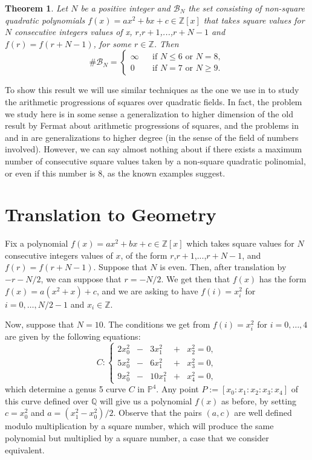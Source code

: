 \documentclass[a4paper,12pt]{amsart}
\newtheorem{thm}{Theorem}
\theoremstyle{remark}
\theoremstyle{definition}
\begin{document}
\begin{thm}\label{Mthm}
Let $N$ be a positive integer and $\mathcal{B}_N$ the set
consisting of non-square quadratic polynomials $f(x)=a x^2+b x+c
\in {{\mathbb{Z}}}[x]$ that takes square values for $N$ consecutive integers
values of x, $r$,$r+1$,...,$r+N-1$ and $f(r)=f(r+N-1)$, for some
$r\in{{\mathbb{Z}}}$. Then
$$
\#\mathcal{B}_N=\left\{
\begin{array}{ccl}
\infty & & \mbox{if $N\le 6$ or $N=8$},\\[1mm]
0 & & \mbox{if $N=7$ or $N\ge 9$}.
\end{array}
\right.
$$
\end{thm}

To show this result we will use similar techniques as the one we
use in \cite{GX} to study the arithmetic progressions of squares
over quadratic fields. In fact, the problem we study here is in
some sense a generalization to higher dimension of the old result
by Fermat about arithmetic progressions of squares, and the
problems in \cite{GX} and in \cite{X} are generalizations to
higher degree (in the sense of the field of numbers involved).
However, we can say almost nothing about if there exists a maximum
number of consecutive square values taken by a non-square
quadratic polinomial, or even if this number is $8$, as the known
examples suggest.

\section{Translation to Geometry}\label{sec2}

Fix a polynomial $f(x)=a x^2+b x+c \in {{\mathbb{Z}}}[x]$ which takes square
values for $N$ consecutive integers values of $x$, of the form
$r$,$r+1$,...,$r+N-1$, and $f(r)=f(r+N-1)$. Suppose that $N$ is even.
Then, after translation by $-r-N/2$, we can suppose that $r=-N/2$.
We get then that $f(x)$ has the form $f(x)=a(x^2+x)+c$, and we are
asking to have $f(i)=x_i^2$ for $i=0,\dots,N/2-1$ and $x_i\in {{\mathbb{Z}}}$.

Now, suppose that $N=10$. The conditions we get from $f(i)=x_i^2$
for $i=0,\dots,4$ are given by the following equations:
$$
C:\left\{
\begin{array}{rcrcc}
2 x_0^2 \!\!\! & - &\!\!\!\!\! 3 x_1^2 &\!\!\! + &\!\!\! x_2^2=0,\\[1mm]
5x_0^2 \!\!\!  & - &\!\!\!\!\! 6 x_1^2 &\!\!\! + &\!\!\! x_3^2=0,\\[1mm]
9 x_0^2 \!\!\! & - &\!\!\!\!\! 10x_1^2 &\!\!\! + &\!\!\! x_4^2=0,
\end{array}
\right.$$
which determine a genus 5 curve $C$ in ${{\mathbb{P}}}^4$. Any point
$P:=[x_0:x_1:x_2:x_3:x_4]$ of this curve defined over ${{\mathbb{Q}}}$ will
give us a polynomial $f(x)$ as before, by setting $c=x_0^2$ and
$a=(x_1^2-x_0^2)/2$. Observe that the pairs $(a,c)$ are well
defined modulo multiplication by a square number, which will
produce the same polynomial but multiplied by a square number, a
case that we consider equivalent.
\end{document}
